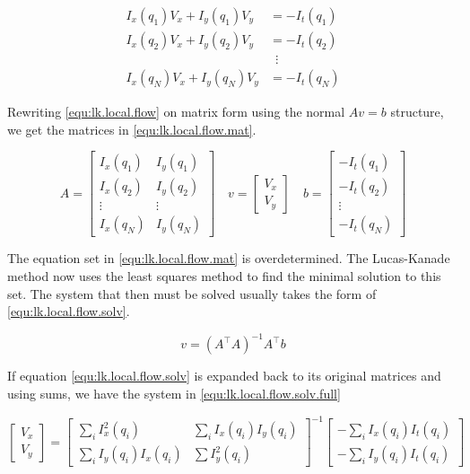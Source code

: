 \begin{equation}\label{equ:lk.local.flow}
	\begin{split}
		I_x(q_1)V_x + I_y(q_1)V_y	&= -I_t(q_1) \\
		I_x(q_2)V_x + I_y(q_2)V_y 	&= -I_t(q_2) \\
		& \,\,\, \vdots \\
		I_x(q_N)V_x + I_y(q_N)V_y 	&= -I_t(q_N)
	\end{split}
\end{equation}

Rewriting \eqref{equ:lk.local.flow} on matrix form using the normal $Av = b$ structure, we get the matrices in \eqref{equ:lk.local.flow.mat}.

\begin{equation} \label{equ:lk.local.flow.mat}
A = \begin{bmatrix}
		I_x(q_1) 	& I_y(q_1) \\
		I_x(q_2) 	& I_y(q_2) \\ 
		\vdots 		& \vdots \\
		I_x(q_N)	& I_y(q_N)
	\end{bmatrix} \quad 
v =	\begin{bmatrix}
		V_x \\ V_y
	\end{bmatrix} \quad
b = \begin{bmatrix}
		-I_t(q_1) \\ -I_t(q_2) \\ \vdots \\ -I_t(q_N)
	\end{bmatrix}
\end{equation}

The equation set in \eqref{equ:lk.local.flow.mat} is overdetermined. The Lucas-Kanade method now uses the 
least squares method to find the minimal solution to this set. The system that then must be solved usually takes the 
form of \eqref{equ:lk.local.flow.solv}.

\begin{equation}\label{equ:lk.local.flow.solv}
	v = \left(A^\top A\right)^{-1} A^\top b
\end{equation}

If equation \eqref{equ:lk.local.flow.solv} is expanded back to its original matrices and using sums, we have the system in \eqref{equ:lk.local.flow.solv.full}

\begin{equation}\label{equ:lk.local.flow.solv.full}
	\begin{bmatrix}
		V_x \\ V_y
	\end{bmatrix} = 
	\begin{bmatrix}
		\sum_ i{I_x^2(q_i)} 	 & \sum_i{I_x(q_i)I_y(q_i)} \\
		\sum_i{I_y(q_i)I_x(q_i)} & \sum{I_y^2(q_i)}
	\end{bmatrix}^{-1}
	\begin{bmatrix}
		-\sum_i{I_x(q_i)I_t(q_i)} \\ -\sum_i{I_y(q_i)I_t(q_i)}
	\end{bmatrix}
\end{equation}

